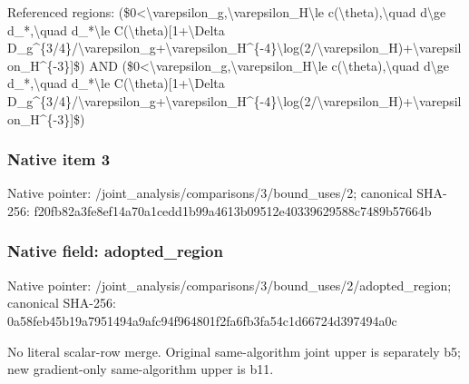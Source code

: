 \documentclass[10pt,a4paper]{article}
\begin{document}
\begingroup\raggedright\sloppy Referenced regions:\allowbreak{} (\$0<\textbackslash{}varepsilon\_\allowbreak{}g,\allowbreak{}\textbackslash{}varepsilon\_\allowbreak{}H\textbackslash{}le c(\textbackslash{}theta),\allowbreak{}\textbackslash{}quad d\textbackslash{}ge d\_\allowbreak{}*,\allowbreak{}\textbackslash{}quad d\_\allowbreak{}*\textbackslash{}le C(\textbackslash{}theta)[1+\textbackslash{}Delta D\_\allowbreak{}g\textasciicircum{}\{3/\allowbreak{}4\}/\allowbreak{}\textbackslash{}varepsilon\_\allowbreak{}g+\textbackslash{}varepsilon\_\allowbreak{}H\textasciicircum{}\{-4\}\textbackslash{}log(2/\allowbreak{}\textbackslash{}varepsilon\_\allowbreak{}H)+\textbackslash{}varepsilon\_\allowbreak{}H\textasciicircum{}\{-3\}]\$) AND (\$0<\textbackslash{}varepsilon\_\allowbreak{}g,\allowbreak{}\textbackslash{}varepsilon\_\allowbreak{}H\textbackslash{}le c(\textbackslash{}theta),\allowbreak{}\textbackslash{}quad d\textbackslash{}ge d\_\allowbreak{}*,\allowbreak{}\textbackslash{}quad d\_\allowbreak{}*\textbackslash{}le C(\textbackslash{}theta)[1+\textbackslash{}Delta D\_\allowbreak{}g\textasciicircum{}\{3/\allowbreak{}4\}/\allowbreak{}\textbackslash{}varepsilon\_\allowbreak{}g+\textbackslash{}varepsilon\_\allowbreak{}H\textasciicircum{}\{-4\}\textbackslash{}log(2/\allowbreak{}\textbackslash{}varepsilon\_\allowbreak{}H)+\textbackslash{}varepsilon\_\allowbreak{}H\textasciicircum{}\{-3\}]\$)\par\endgroup

\subsubsection{Native item 3}
Native pointer: /joint\_\allowbreak{}analysis/comparisons/3/bound\_\allowbreak{}uses/2; canonical SHA-256: f20fb82a3fe8ef14a70a1cedd1b99a4613b09512e40339629588c7489b57664b

\subsubsection{Native field: adopted\_\allowbreak{}region}
Native pointer: /joint\_\allowbreak{}analysis/comparisons/3/bound\_\allowbreak{}uses/2/adopted\_\allowbreak{}region; canonical SHA-256: 0a58feb45b19a7951494a9afc94f964801f2fa6fb3fa54c1d66724d397494a0c

\begingroup\raggedright\sloppy No literal scalar-row merge. Original same-algorithm joint upper is separately b5;\allowbreak{} new gradient-only same-algorithm upper is b11.\par\endgroup
\end{document}
